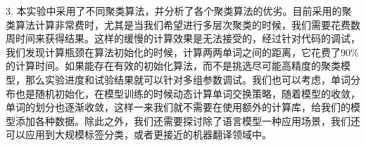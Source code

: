 3. 本实验中采用了不同聚类算法，并分析了各个聚类算法的优劣。目前采用的聚类算法计算非常费时，尤其是当我们希望进行多层次聚类的时候，我们需要花费数周时间来获得结果。这样的缓慢的计算效果是无法接受的，经过针对代码的调试，我们发现计算瓶颈在算法初始化的时候，计算两两单词之间的距离，它花费了90\%的计算时间。如果能存在有效的初始化算法，而不是挑选尽可能高精度的聚类模型，那么实验进度和试验结果就可以针对多组参数调试。我们也可以考虑，单词分布也是随机初始化，在模型训练的时候动态计算单词交换策略，随着模型的收敛，单词的划分也逐渐收敛，这样一来我们就不需要在使用额外的计算库，给我们的模型添加各种数据。除此之外，我们还需要探讨除了语言模型一种应用场景，我们还可以应用到大规模标签分类，或者更接近的机器翻译领域中。
